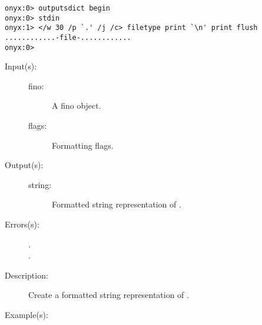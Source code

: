 \begin{description}
\begin{description}
\begin{verbatim}
onyx:0> outputsdict begin
onyx:0> stdin
onyx:1> </w 30 /p `.' /j /c> filetype print `\n' print flush
............-file-............
onyx:0>
		\end{verbatim}
	\end{description}
\label{outputsdict:finotype}
\item[{\onyxop{fino flags}{finotype}{string}}: ]
	\begin{description}\item[]
	\item[Input(s): ]
		\begin{description}\item[]
		\item[fino: ]
			A fino object.
		\item[flags: ]
			Formatting flags.
		\end{description}
	\item[Output(s): ]
		\begin{description}\item[]
		\item[string: ]
			Formatted string representation of .
		\end{description}
	\item[Errors(s): ]
		\begin{description}\item[]
		\item[.]
		\item[.]
		\end{description}
	\item[Description: ]
		Create a formatted string representation of .
	\item[Example(s): ]\begin{verbatim}


\end{verbatim}
\end{description}
\end{description}
